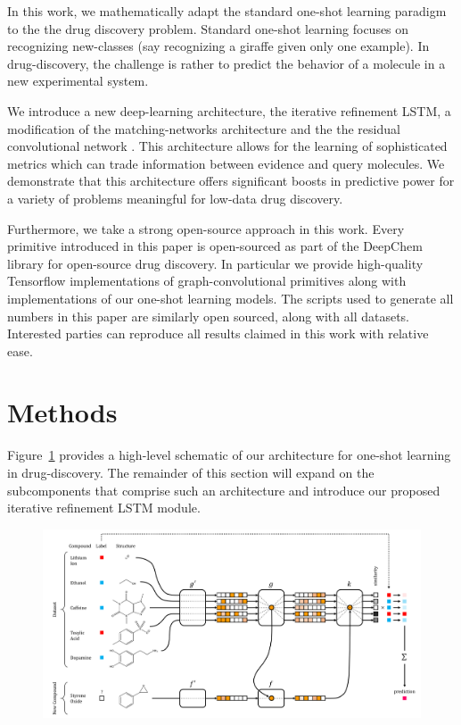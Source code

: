 \documentclass[journal=jacsat,manuscript=article]{achemso}
\begin{document}
In this work, we mathematically adapt the standard one-shot learning paradigm to the the drug discovery problem. Standard one-shot learning focuses on recognizing new-classes (say recognizing a giraffe given only one example). In drug-discovery, the challenge is rather to predict the behavior of a molecule in a new experimental system.

We introduce a new deep-learning architecture, the iterative refinement LSTM, a modification of the matching-networks architecture and the the residual convolutional network \cite{he2016identity}. This architecture allows for the learning of sophisticated metrics which can trade information between evidence and query molecules. We demonstrate that this architecture offers significant boosts in predictive power for a variety of problems meaningful for low-data drug discovery.

Furthermore, we take a strong open-source approach in this work. Every primitive introduced in this paper is open-sourced as part of the DeepChem \cite{ram2016} library for open-source drug discovery. In particular we provide high-quality Tensorflow \cite{abadi2016tensorflow} implementations of graph-convolutional primitives along with implementations of our one-shot learning models. The scripts used to generate all numbers in this paper are similarly open sourced, along with all datasets. Interested parties can reproduce all results claimed in this work with relative ease.


\section{Methods}
Figure~\ref{fig:schematic} provides a high-level schematic of our architecture for one-shot learning in drug-discovery. The remainder of this section will expand on the subcomponents that comprise such an architecture and introduce our proposed iterative refinement LSTM module.

\begin{figure}[h]
\includegraphics[width=\textwidth]{schematic_v2.png}
\label{fig:schematic}
\end{figure}
\end{document}
